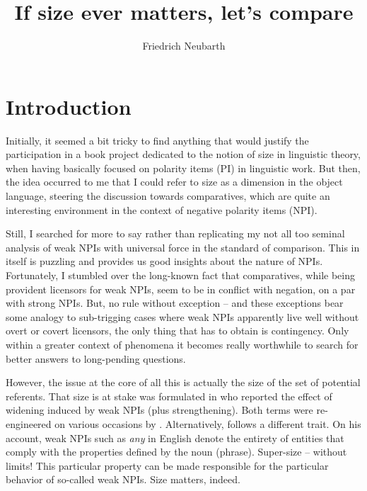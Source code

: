 \documentclass[output=paper,colorlinks,citecolor=brown,
]{langscibook}
\author{Friedrich Neubarth\affiliation{Austrian Research Institute for Artificial Intelligence (OFAI); University of Vienna}}
\title{If size ever matters, let's compare}
\begin{document}
\let\lsDeterminePaperAuthorAffiliationIndexing\relax
\maketitle


\section{Introduction}

Initially, it seemed a bit tricky to find anything that would justify the participation in a book project dedicated to
the notion of size in linguistic theory, when having basically focused on polarity items (PI) in linguistic work. But
then, the idea occurred to me that I could refer to size as a dimension in the object language, steering the discussion
towards comparatives, which are quite an interesting environment in the context of negative polarity items (NPI).

Still, I searched for more to say rather than replicating my not all too seminal analysis of weak NPIs with universal
force in the standard of comparison. This in itself is puzzling and provides us good insights about the nature of
NPIs. Fortunately, I stumbled over the long-known fact that comparatives, while being provident licensors for weak NPIs,
seem to be in conflict with negation, on a par with strong NPIs. But, no rule without exception -- and these exceptions
bear some analogy to sub-trigging cases where weak NPIs apparently live well without overt or covert licensors, the
only thing that has to obtain is contingency. Only within a greater context of phenomena it becomes really worthwhile
to search for better answers to long-pending questions.

However, the issue at the core of all this is actually the size of the set of potential referents. That size is at
stake was formulated in \citet{kadmonlandmann1993} who reported the effect of widening induced by weak NPIs (plus
strengthening). Both terms were re-engineered on various occasions by \citet{chierchia2004,chierchia2013}.
Alternatively, \citet{krifka1995} follows a different trait. On his account, weak NPIs such as \textit{any} in English
denote the entirety of entities that comply with the properties defined by the noun (phrase). Super-size -- without limits!
This particular property can be made responsible for the particular behavior of so-called weak NPIs. Size matters,
indeed.
\end{document}
